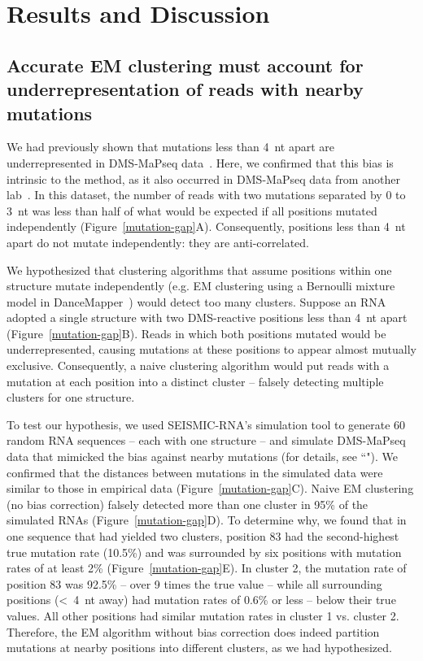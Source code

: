 \documentclass[11pt]{article}
\begin{document}
\section{Results and Discussion}
\label{results-section}

\subsection{Accurate EM clustering must account for underrepresentation of reads with nearby mutations}
\label{mutation-gap-section}

We had previously shown that mutations less than 4~nt apart are underrepresented in DMS-MaPseq data~\cite{Tomezsko2020}.
Here, we confirmed that this bias is intrinsic to the method, as it also occurred in DMS-MaPseq data from another lab~\cite{Morandi2021}.
In this dataset, the number of reads with two mutations separated by 0 to 3~nt was less than half of what would be expected if all positions mutated independently (Figure~\ref{mutation-gap}A).
Consequently, positions less than 4~nt apart do not mutate independently: they are anti-correlated.

We hypothesized that clustering algorithms that assume positions within one structure mutate independently (e.g. EM clustering using a Bernoulli mixture model in DanceMapper~\cite{Olson2022}) would detect too many clusters.
Suppose an RNA adopted a single structure with two DMS-reactive positions less than 4~nt apart (Figure~\ref{mutation-gap}B).
Reads in which both positions mutated would be underrepresented, causing mutations at these positions to appear almost mutually exclusive.
Consequently, a naive clustering algorithm would put reads with a mutation at each position into a distinct cluster -- falsely detecting multiple clusters for one structure.

To test our hypothesis, we used SEISMIC-RNA's simulation tool to generate 60 random RNA sequences -- each with one structure -- and simulate DMS-MaPseq data that mimicked the bias against nearby mutations (for details, see ``").
We confirmed that the distances between mutations in the simulated data were similar to those in empirical data (Figure~\ref{mutation-gap}C).
Naive EM clustering (no bias correction) falsely detected more than one cluster in 95\% of the simulated RNAs (Figure~\ref{mutation-gap}D).
To determine why, we found that in one sequence that had yielded two clusters, position 83 had the second-highest true mutation rate (10.5\%) and was surrounded by six positions with mutation rates of at least 2\% (Figure~\ref{mutation-gap}E).
In cluster 2, the mutation rate of position 83 was 92.5\% -- over 9 times the true value -- while all surrounding positions (<~4~nt away) had mutation rates of 0.6\% or less -- below their true values.
All other positions had similar mutation rates in cluster 1 vs. cluster 2.
Therefore, the EM algorithm without bias correction does indeed partition mutations at nearby positions into different clusters, as we had hypothesized.
\end{document}
